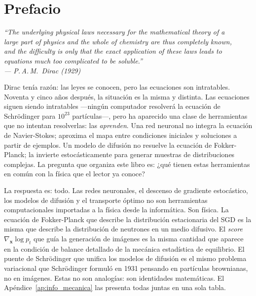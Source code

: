 \chapter*{Prefacio}

\begin{flushright}
\itshape
``The underlying physical laws necessary for the mathematical theory of a\\
large part of physics and the whole of chemistry are thus completely known,\\
and the difficulty is only that the exact application of these laws leads to\\
equations much too complicated to be soluble.''\\[4pt]
\upshape --- P.\,A.\,M.\ Dirac (1929)
\end{flushright}
\bigskip

Dirac tenía razón: las leyes se conocen, pero las ecuaciones son intratables.
Noventa y cinco años después, la situación es la misma y distinta. Las
ecuaciones siguen siendo intratables —ningún computador resolverá la ecuación
de Schrödinger para $10^{23}$ partículas—, pero ha aparecido una clase de
herramientas que no intentan resolverlas: las \emph{aprenden}. Una red neuronal
no integra la ecuación de Navier-Stokes; aproxima el mapa entre condiciones
iniciales y soluciones a partir de ejemplos. Un modelo de difusión no resuelve
la ecuación de Fokker-Planck; la invierte estocásticamente para generar muestras
de distribuciones complejas. La pregunta que organiza este libro es: ¿qué
tienen estas herramientas en común con la física que el lector ya conoce?

La respuesta es: todo. Las redes neuronales, el descenso de gradiente
estocástico, los modelos de difusión y el transporte óptimo no son
herramientas computacionales importadas a la física desde la informática. Son
física. La ecuación de Fokker-Planck que describe la distribución estacionaria
del SGD es la misma que describe la distribución de neutrones en un medio
difusivo. El \textit{score} $\nabla_{\bm{x}}\log p_t$ que guía la generación
de imágenes es la misma cantidad que aparece en la condición de balance
detallado de la mecánica estadística de equilibrio. El puente de Schrödinger
que unifica los modelos de difusión es el mismo problema variacional que
Schrödinger formuló en 1931 pensando en partículas brownianas, no en
imágenes. Estas no son analogías: son identidades matemáticas. El
Apéndice~\ref{ap:info_mecanica} las presenta todas juntas en una sola tabla.

